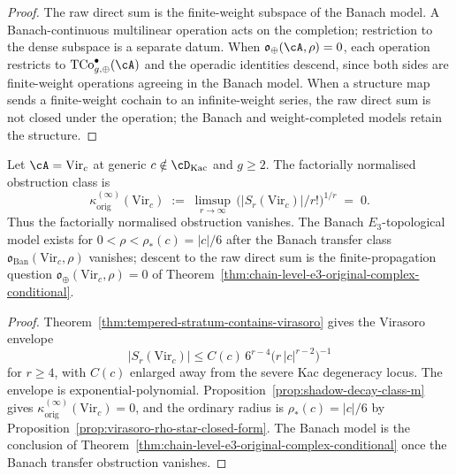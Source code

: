 \begin{proof}
The raw direct sum is the finite-weight subspace of the Banach model.
A Banach-continuous multilinear operation acts on the completion;
restriction to the dense subspace is a separate datum. When
$\mathfrak{o}_{\oplus}(\cA,\rho)=0$, each operation restricts to
$\mathrm{TCo}^{\bullet}_{g,\oplus}(\cA)$ and the operadic identities
descend, since both sides are finite-weight operations agreeing in the
Banach model. When a structure map sends a finite-weight cochain to an
infinite-weight series, the raw direct sum is not closed under the
operation; the Banach and weight-completed models retain the
structure.
\end{proof}

\begin{theorem}
\label{thm:chain-level-e3-original-complex-obstruction-generic-class-m}
Let $\cA = \mathrm{Vir}_c$ at generic $c \notin \cD_{\mathrm{Kac}}$
and $g \ge 2$. The factorially normalised obstruction class is
\[
 \kappa^{(\infty)}_{\mathrm{orig}}(\mathrm{Vir}_c)
 \;:=\;
 \limsup_{r \to \infty}\,
 \bigl( \lvert S_r(\mathrm{Vir}_c) \rvert / r! \bigr)^{1/r}
 \;=\;
 0.
\]
Thus the factorially normalised obstruction vanishes. The Banach
$E_3$-topological model exists for
$0<\rho<\rho_*(c)=\lvert c\rvert/6$ after the Banach transfer class
$\mathfrak{o}_{\mathrm{Ban}}(\mathrm{Vir}_c,\rho)$ vanishes; descent
to the raw direct sum is the finite-propagation question
$\mathfrak{o}_{\oplus}(\mathrm{Vir}_c,\rho)=0$ of
Theorem~\ref{thm:chain-level-e3-original-complex-conditional}.
\end{theorem}

\begin{proof}
Theorem~\ref{thm:tempered-stratum-contains-virasoro} gives the
Virasoro envelope
\[
 \lvert S_r(\mathrm{Vir}_c)\rvert
 \le C(c)\,6^{r-4}\bigl(r\,\lvert c\rvert^{r-2}\bigr)^{-1}
\]
for $r\ge 4$, with $C(c)$ enlarged away from the severe Kac
degeneracy locus. The envelope is exponential-polynomial.
Proposition~\ref{prop:shadow-decay-class-m} gives
$\kappa^{(\infty)}_{\mathrm{orig}}(\mathrm{Vir}_c)=0$, and the ordinary
radius is
$\rho_*(c)=\lvert c\rvert/6$ by
Proposition~\ref{prop:virasoro-rho-star-closed-form}. The Banach
model is the conclusion of
Theorem~\ref{thm:chain-level-e3-original-complex-conditional} once the
Banach transfer obstruction vanishes.
\end{proof}

